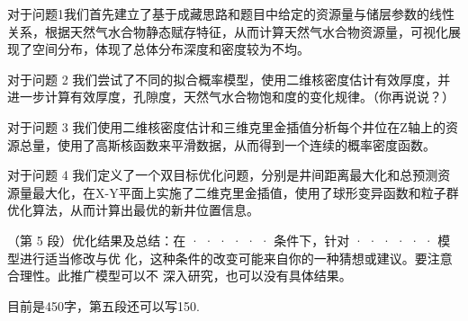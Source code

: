 

{\song\xiaosihao
\setlength{\parindent}{2em}对于问题1我们首先建立了基于成藏思路和题目中给定的资源量与储层参数的线性关系，根据天然气水合物静态赋存特征，从而计算天然气水合物资源量，可视化展现了空间分布，体现了总体分布深度和密度较为不均。


\setlength{\parindent}{2em}
对于问题 2 我们尝试了不同的拟合概率模型，使用二维核密度估计有效厚度，并进一步计算有效厚度，孔隙度，天然气水合物饱和度的变化规律。（你再说说？）

\setlength{\parindent}{2em}对于问题 3 我们使用二维核密度估计和三维克里金插值分析每个井位在Z轴上的资源总量，使用了高斯核函数来平滑数据，从而得到一个连续的概率密度函数。

\setlength{\parindent}{2em}对于问题 4 我们定义了一个双目标优化问题，分别是井间距离最大化和总预测资源量最大化，在X-Y平面上实施了二维克里金插值，使用了球形变异函数和粒子群优化算法，从而计算出最优的新井位置信息。

\setlength{\parindent}{2em}（第 5 段）优化结果及总结：在 · · · · · · 条件下，针对 · · · · · · 模型进行适当修改与优
化，这种条件的改变可能来自你的一种猜想或建议。要注意合理性。此推广模型可以不
深入研究，也可以没有具体结果。}
\begin{rmk}
    目前是450字，第五段还可以写150.
\end{rmk}






